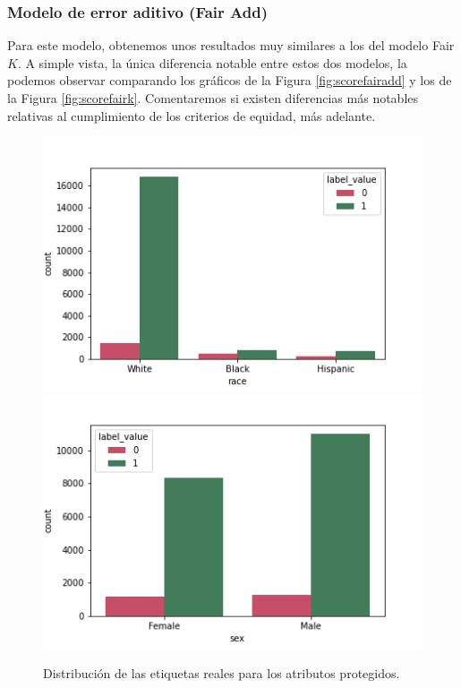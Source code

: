 \documentclass[oneside,openright,titlepage,numbers=noenddot,openany,headinclude,footinclude=true,
cleardoublepage=empty,abstractoff,BCOR=5mm,paper=a4,fontsize=12pt,main=spanish]{scrreprt}
\begin{document}
\subsubsection*{Modelo de error aditivo (Fair Add)}

Para este modelo, obtenemos unos resultados muy similares a los del modelo Fair $K$. A simple vista, la única diferencia notable entre estos dos modelos, la podemos observar comparando los gráficos de la Figura \ref{fig:scorefairadd} y los de la Figura \ref{fig:scorefairk}. Comentaremos si existen diferencias más notables relativas al cumplimiento de los criterios de equidad, más adelante.\\

\begin{figure}[h]
      \includegraphics[width=\linewidth]{images/label_race_law_2.png}
    \endminipage\hfill
      \includegraphics[width=\linewidth]{images/label_sex_law_2.png}
    \endminipage
     \caption{Distribución de las etiquetas reales para los atributos protegidos.}
     \label{fig:labelracesex1}
\end{figure}
\end{document}
